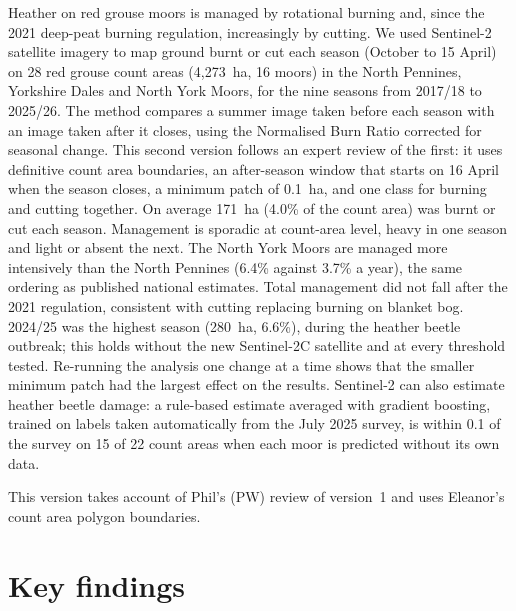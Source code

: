 \documentclass[11pt,a4paper]{article}
\begin{document}
\begin{titlepage}
\begin{tcolorbox}[enhanced,colback=accentlight,colframe=accentlight,arc=1.5pt,left=11pt,right=11pt,top=9pt,bottom=9pt]
Heather on red grouse moors is managed by rotational burning and, since the 2021 deep-peat burning regulation, increasingly by cutting. We used Sentinel-2 satellite imagery to map ground burnt or cut each season (October to 15 April) on 28 red grouse count areas (4,273~ha, 16 moors) in the North Pennines, Yorkshire Dales and North York Moors, for the nine seasons from 2017/18 to 2025/26. The method compares a summer image taken before each season with an image taken after it closes, using the Normalised Burn Ratio corrected for seasonal change. This second version follows an expert review of the first: it uses definitive count area boundaries, an after-season window that starts on 16 April when the season closes, a minimum patch of 0.1~ha, and one class for burning and cutting together. On average 171~ha (4.0\% of the count area) was burnt or cut each season. Management is sporadic at count-area level, heavy in one season and light or absent the next. The North York Moors are managed more intensively than the North Pennines (6.4\% against 3.7\% a year), the same ordering as published national estimates. Total management did not fall after the 2021 regulation, consistent with cutting replacing burning on blanket bog. 2024/25 was the highest season (280~ha, 6.6\%), during the heather beetle outbreak; this holds without the new Sentinel-2C satellite and at every threshold tested. Re-running the analysis one change at a time shows that the smaller minimum patch had the largest effect on the results. Sentinel-2 can also estimate heather beetle damage: a rule-based estimate averaged with gradient boosting, trained on labels taken automatically from the July 2025 survey, is within 0.1 of the survey on 15 of 22 count areas when each moor is predicted without its own data.
\end{tcolorbox}
\vspace{0.5cm}
{\small\color{muted}This version takes account of Phil's (PW) review of version~1 and uses Eleanor's count area polygon boundaries.\par}
\restoregeometry
\end{titlepage}

\thispagestyle{plain}
\tableofcontents
\clearpage
\restoregeometry
{}

\section*{Key findings}
\end{document}
